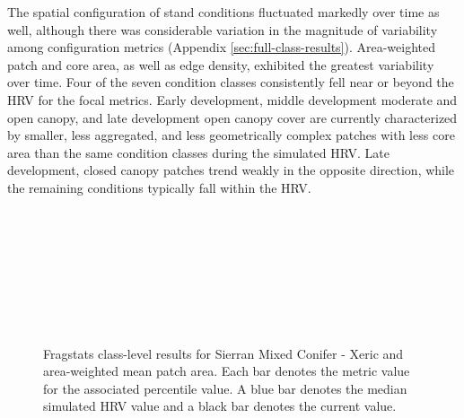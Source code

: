 The spatial configuration of stand conditions fluctuated markedly over time as well, although there was considerable variation in the magnitude of variability among configuration metrics (Appendix \ref{sec:full-class-results}). Area-weighted patch and core area, as well as edge density, exhibited the greatest variability over time. Four of the seven condition classes consistently fell near or beyond the HRV for the focal metrics. Early development, middle development moderate and open canopy, and late development open canopy cover are currently characterized by smaller, less aggregated, and less geometrically complex patches with less core area than the same condition classes during the simulated HRV. Late development, closed canopy patches trend weakly in the opposite direction, while the remaining conditions typically fall within the HRV.




\begin{figure}[!htbp]
  \\%
  \\%
    \\%
    \\%
    \\%
    \\%
    \\%
  \caption{Fragstats class-level results for Sierran Mixed Conifer - Xeric and area-weighted mean patch area. Each bar denotes the metric value for the associated percentile value. A blue bar denotes the median simulated HRV value and a black bar denotes the current value.}
  \label{fig:smcx_areaam}
\end{figure}

